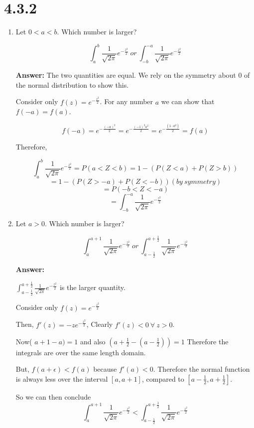 \documentclass[svgnames]{article}
\begin{document}
\section{4.3.2}
\begin{enumerate}[label=(\alph*)]
\item Let $0<a<b$. Which number is larger?

$$\int^{b}_{a}\frac{1}{\sqrt{2\pi}}e^{-\frac{z^2}{2}} \ or\  \int^{-a}_{-b}\frac{1}{\sqrt{2\pi}}e^{-\frac{z^2}{2}}$$

\textbf{Answer:}
The two quantities are equal. We rely on the symmetry about 0 of the normal distribution to show this.

Consider only $f(z) = e^{-\frac{z^2}{2}}$. For any number $a$ we can show that $f(-a)=f(a)$.

$$f(-a) = e^{-\frac{(-a)^2}{2}} = e^{-\frac{(-1)^2a^2}{2}} = e^{-\frac{(1\cdot a^2)}{2}} = f(a) $$

Therefore,

\[ \int^{b}_{a}\frac{1}{\sqrt{2\pi}}e^{-\frac{z^2}{2}}=P(a<Z<b) = 1 - (P(Z<a) + P(Z > b))\]
\[= 1 - (P(Z> -a) + P(Z < - b)) (by \ symmetry) \]
\[= P(-b < Z < -a) \]
\[= \int^{-a}_{-b}\frac{1}{\sqrt{2\pi}}e^{-\frac{z^2}{2}} \]

\item Let $a>0$. Which number is larger?

$$\int^{a+1}_{a}\frac{1}{\sqrt{2\pi}}e^{-\frac{z^2}{2}} \ or\  \int^{a+\frac{1}{2}}_{a-\frac{1}{2}}\frac{1}{\sqrt{2\pi}}e^{-\frac{z^2}{2}}$$

\textbf{Answer:}

 $\int^{a+\frac{1}{2}}_{a-\frac{1}{2}}\frac{1}{\sqrt{2\pi}}e^{-\frac{z^2}{2}}$ is the larger quantity.
 
Consider only $f(z) = e^{-\frac{z^2}{2}}$

Then, $f'(z)=-z e^{-\frac{z^2}{2}}$, Clearly $f'(z)<0 \ \forall \  z >0 $.

Now( $a+1-a )=1$ and also $(a+\frac{1}{2} - (a-\frac{1}{2}))=1$ Therefore the integrals are over the same length domain.

But, $f(a+\epsilon)<f(a)$ because $f'(a)<0$. Therefore the normal function is always less over the interval $[a, a+1]$, compared to $[a-\frac{1}{2}, a+\frac{1}{2}]$. 

So we can then conclude
$$\int^{a+1}_{a}\frac{1}{\sqrt{2\pi}}e^{-\frac{z^2}{2}} <  \int^{a+\frac{1}{2}}_{a-\frac{1}{2}}\frac{1}{\sqrt{2\pi}}e^{-\frac{z^2}{2}}$$

\end{enumerate}
\end{document}
